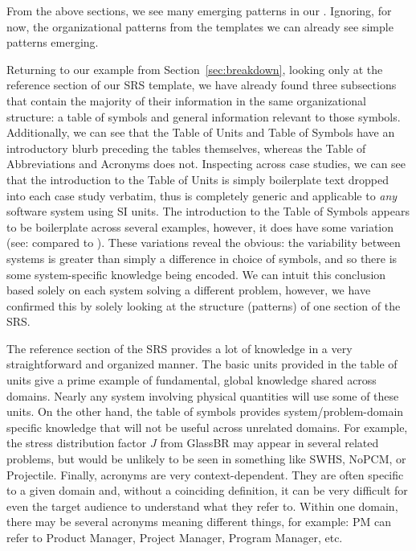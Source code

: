From the above sections, we see many emerging patterns in our \sfs{}. Ignoring, 
for now, the organizational patterns from the \smithea{} templates we can 
already see simple patterns emerging.

Returning to our example from Section~\ref{sec:breakdown}, looking only at the 
reference section of our SRS template, we have already found
three subsections that contain the majority of their information in the same
organizational structure: a table of symbols and general information relevant 
to those symbols. Additionally, we can see that the Table of Units and Table of 
Symbols have an introductory blurb preceding the tables themselves, whereas the 
Table of Abbreviations and Acronyms does not. Inspecting across case studies, 
we can see that the introduction to the Table of Units is simply boilerplate 
text dropped into each case study verbatim, thus is completely generic and 
applicable to \emph{any} software system using SI units. The introduction to 
the Table of Symbols appears to be boilerplate across several examples, 
however, it does have some variation (see: \gp{} compared to \gb).
These variations reveal the obvious: the variability between systems is greater 
than simply a difference in choice of symbols, and so there is some 
system-specific knowledge being encoded. We can intuit this conclusion based 
solely on each system solving a different problem, however, we have confirmed 
this by solely looking at the structure (patterns) of one section of the SRS.

The reference section of the SRS provides a lot of knowledge in a very 
straightforward and organized manner. The basic units provided in the table of 
units give a prime example of fundamental, global knowledge shared across 
domains. Nearly any system involving physical quantities will use some of these 
units. On the other hand, the table of symbols provides system/problem-domain 
specific knowledge that will not be useful across unrelated domains. For 
example, the stress distribution factor $J$ from GlassBR may appear in several 
related problems, but would be unlikely to be seen in something like SWHS, 
NoPCM, or Projectile. Finally, acronyms are very context-dependent. They are 
often specific to a given domain and, without a coinciding definition, it can 
be very difficult for even the target audience to understand what they refer 
to. Within one domain, there may be several acronyms meaning different things, 
for example: PM can refer to Product Manager, Project Manager, Program 
Manager, etc.

